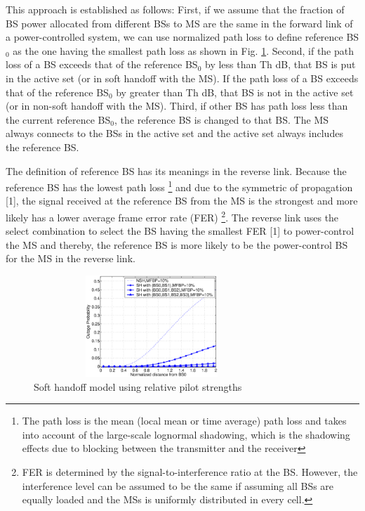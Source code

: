 This approach is established as follows: First, if we assume that
the fraction of BS power allocated from different BSs to MS are
the same in the forward link of a power-controlled system, we can
use normalized path loss to define reference BS$_{0}$ as the one
having the smallest path loss as shown in Fig. \ref{figrawcon:2}.
Second, if the path loss of a BS exceeds that of the reference
BS$_0$ by less than Th dB, that BS is put in the active set (or in
soft handoff with the MS). If the path loss of a BS exceeds that
of the reference BS$_0$ by greater than Th dB, that BS is not in
the active set (or in non-soft handoff with the MS). Third, if
other BS has path loss less than the current reference BS$_{0}$,
the reference BS is changed to that BS. The MS always connects to
the BSs in the active set and the active set always includes the
reference BS.

The definition of reference BS has its meanings in the reverse
link. Because the reference BS has the lowest path loss
\footnote{The path loss is the mean (local mean or time average)
path loss and takes into account of the large-scale lognormal
shadowing, which is the shadowing effects due to blocking between
the transmitter and the receiver} and due to the symmetric of
propagation [1], the signal received at the reference BS from the
MS is the strongest and more likely has a lower average frame
error rate (FER) \footnote{FER is determined by the
signal-to-interference ratio at the BS. However, the interference
level can be assumed to be the same if assuming all BSs are
equally loaded and the MSs is uniformly distributed in every
cell.}. The reverse link uses the select combination to select the
BS having the smallest FER [1] to power-control the MS and
thereby, the reference BS is more likely to be the power-control
BS for the MS in the reverse link.
\begin{figure}[tbp]
 \centerline{\includegraphics[width=3.5in,height=1.5in]{./separateoutage10.eps}}
 \caption{Soft handoff model using relative pilot strengths} \label{figrawcon:2}
\end{figure}

